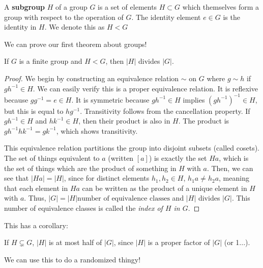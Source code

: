 \begin{definition}
	A \textbf{subgroup} $H$ of a group $G$ is a set of elements $H\subset G$ which themselves form a group with respect to the operation of $G$.  The identity element $e\in G$ is the identity in $H$. We denote this as $H<G$
\end{definition}



We can prove our first theorem about groups!
\begin{theorem}
	If $G$ is a finite group and $H<G$, then $|H|$ divides $|G|$.
\end{theorem}

\begin{proof}
	We begin by constructing an equivalence relation $\sim$ on $G$ where $g\sim h$ if $gh^{-1}\in H$.  We can easily verify this is a proper equivalence relation.  It is reflexive because $gg^{-1}=e\in H$.  It is symmetric because $gh^{-1}\in H$ implies $(gh^{-1})^{-1}\in H$, but this is equal to $hg^{-1}$.  Transitivity follows from the cancellation property.  If $gh^{-1}\in H$ and $hk^{-1}\in H$, then their product is also in $H$. The product is $gh^{-1}hk^{-1} = gk^{-1}$, which shows transitivity.
	
	This equivalence relation partitions the group into disjoint subsets (called cosets). The set of things equivalent to $a$ (written $[a]$) is exactly the set $Ha$, which is the set of things which are the product of something in $H$ with $a$.  Then, we can see that $|Ha|=|H|$, since for distinct elements $h_1,h_2\in H$, $h_1a\neq h_2a$, meaning that each element in $Ha$ can be written as the product of a unique element in $H$ with $a$.  Thus, $|G| = |H|\text{number of equivalence classes}$ and $|H|$ divides $|G|$.  This number of equivalence classes is called the \textit{index of $H$ in $G$}.
\end{proof}

This has a corollary:
\begin{corollary}
	If $H\subsetneq G$, $|H|$ is at most half of $|G|$, since $|H|$ is a proper factor of $|G|$ (or 1...).
\end{corollary}

We can use this to do a randomized thingy!

